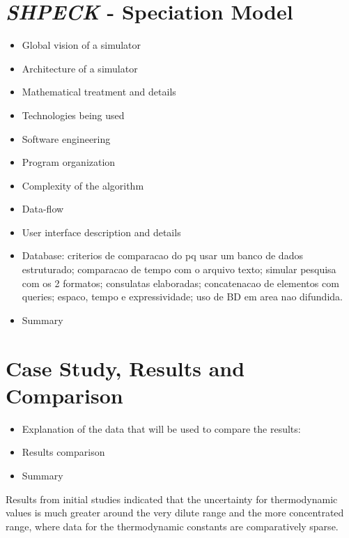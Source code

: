 \documentclass[ppgc,mestrado,english]{iiufrgs}
\begin{document}
\chapter{\emph{SHPECK} - Speciation Model}
\label{chapter:SHPECK}
\begin{itemize}
\item	Global vision of a simulator
\item	Architecture of a simulator
\item	Mathematical treatment and details
\item	Technologies being used
\item	Software engineering
\item	Program organization
\item	Complexity of the algorithm
\item	Data-flow
\item	User interface description and details
\item	Database: criterios de comparacao do pq usar um banco de dados estruturado; comparacao de tempo com o arquivo texto; simular pesquisa com os 2 formatos; consulatas elaboradas; concatenacao de elementos com queries; espaco, tempo e expressividade; uso de BD em area nao difundida.
\item	Summary
\end{itemize}


\chapter{Case Study, Results and Comparison}
\begin{itemize}
\item Explanation of the data that will be used to compare the results: 
\item Results comparison 
\item	Summary
\end{itemize}

Results from initial studies indicated that the uncertainty for thermodynamic values is much greater around the very dilute range and the more concentrated range, where data for the thermodynamic constants are comparatively sparse. 

\end{document}
